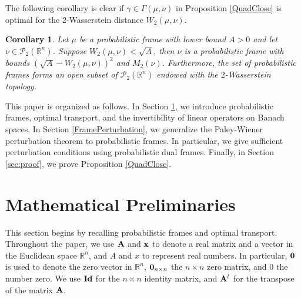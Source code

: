 \documentclass{amsart}
\numberwithin{equation}{section}
\theoremstyle{plain}
\newtheorem{corollary}[theorem]{Corollary}
\theoremstyle{definition}
\begin{document}
The following corollary is clear if $\gamma \in \Gamma(\mu, \nu)$ in Proposition \ref{QuadClose} is optimal for the $2$-Wasserstein distance $W_2(\mu, \nu)$.

\begin{corollary}\label{openness}
    Let $\mu$ be a probabilistic frame with lower bound  $A>0$ and let $\nu \in \mathcal{P}_2(\mathbb{R}^n)$. Suppose $W_2(\mu, \nu) < \sqrt{A}$,
then $\nu$ is a probabilistic frame with bounds $(\sqrt{A}-W_2(\mu, \nu))^2 $ and $M_2(\nu)$. Furthermore, the set of probabilistic frames forms an open subset of $\mathcal{P}_2(\mathbb{R}^n)$ endowed with the  $2$-Wasserstein topology.
\end{corollary}


This paper is organized as follows. In Section \ref{preliminaries}, we introduce probabilistic frames, optimal transport, and the invertibility of linear operators on Banach spaces.  
In Section \ref{FramePerturbation}, we generalize the Paley-Wiener perturbation theorem to probabilistic frames. In particular, we give sufficient perturbation conditions using probabilistic dual frames. Finally, in Section \ref{sec:proof}, we prove Proposition \ref{QuadClose}.


\section{Mathematical Preliminaries}\label{preliminaries}

This section begins by recalling probabilistic frames and optimal transport. Throughout the paper, we use ${\bf A}$ and ${\bf x}$ to denote a real matrix and a vector in the Euclidean space $\mathbb{R}^n$, and $A$ and $x$ to represent real numbers. In particular, ${\bf 0}$ is used to denote the zero vector in $\mathbb{R}^n$, ${\bf 0}_{n \times n}$ the $n \times n$ zero matrix, and $0$ the number zero. We use ${\bf Id}$ for the $n \times n$ identity matrix, and  ${\bf A}^t$ for the transpose of the matrix ${\bf A}$. 
\end{document}

